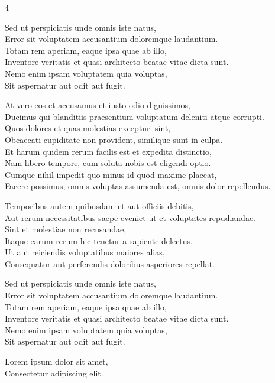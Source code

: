 \documentclass[a4paper,landscape]{memoir}
\begin{document}
\begin{multicols*}{4}
\begin{lyrics}
Sed ut perspiciatis unde omnis iste natus,\\
Error sit voluptatem accusantium doloremque laudantium.\\
Totam rem aperiam, eaque ipsa quae ab illo,\\
Inventore veritatis et quasi architecto beatae vitae dicta sunt.\\
Nemo enim ipsam voluptatem quia voluptas,\\
Sit aspernatur aut odit aut fugit.

At vero eos et accusamus et iusto odio dignissimos,\\
Ducimus qui blanditiis praesentium voluptatum deleniti atque corrupti.\\
Quos dolores et quas molestias excepturi sint,\\
Obcaecati cupiditate non provident, similique sunt in culpa.\\
Et harum quidem rerum facilis est et expedita distinctio,\\
Nam libero tempore, cum soluta nobis est eligendi optio.\\
Cumque nihil impedit quo minus id quod maxime placeat,\\
Facere possimus, omnis voluptas assumenda est, omnis dolor repellendus.

Temporibus autem quibusdam et aut officiis debitis,\\
Aut rerum necessitatibus saepe eveniet ut et voluptates repudiandae.\\
Sint et molestiae non recusandae,\\
Itaque earum rerum hic tenetur a sapiente delectus.\\
Ut aut reiciendis voluptatibus maiores alias,\\
Consequatur aut perferendis doloribus asperiores repellat.

Sed ut perspiciatis unde omnis iste natus,\\
Error sit voluptatem accusantium doloremque laudantium.\\
Totam rem aperiam, eaque ipsa quae ab illo,\\
Inventore veritatis et quasi architecto beatae vitae dicta sunt.\\
Nemo enim ipsam voluptatem quia voluptas,\\
Sit aspernatur aut odit aut fugit.

Lorem ipsum dolor sit amet,\\
Consectetur adipiscing elit.
\end{lyrics}
\end{multicols*}
\end{document}

